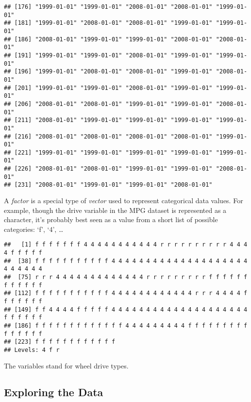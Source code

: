 \documentclass[
]{article}
\newenvironment{Shaded}{\begin{snugshade}}{\end{snugshade}}
\newcommand{\FunctionTok}[1]{\textcolor[rgb]{0.00,0.00,0.00}{#1}}
\newcommand{\NormalTok}[1]{#1}
\newcommand{\SpecialCharTok}[1]{\textcolor[rgb]{0.00,0.00,0.00}{#1}}
\begin{document}
\begin{verbatim}
## [176] "1999-01-01" "1999-01-01" "2008-01-01" "2008-01-01" "1999-01-01"
## [181] "1999-01-01" "2008-01-01" "2008-01-01" "1999-01-01" "1999-01-01"
## [186] "2008-01-01" "1999-01-01" "1999-01-01" "2008-01-01" "2008-01-01"
## [191] "1999-01-01" "1999-01-01" "2008-01-01" "1999-01-01" "1999-01-01"
## [196] "1999-01-01" "2008-01-01" "2008-01-01" "1999-01-01" "2008-01-01"
## [201] "1999-01-01" "1999-01-01" "2008-01-01" "1999-01-01" "1999-01-01"
## [206] "2008-01-01" "2008-01-01" "1999-01-01" "1999-01-01" "2008-01-01"
## [211] "2008-01-01" "1999-01-01" "1999-01-01" "1999-01-01" "1999-01-01"
## [216] "2008-01-01" "2008-01-01" "2008-01-01" "2008-01-01" "1999-01-01"
## [221] "1999-01-01" "1999-01-01" "1999-01-01" "1999-01-01" "1999-01-01"
## [226] "2008-01-01" "2008-01-01" "1999-01-01" "1999-01-01" "2008-01-01"
## [231] "2008-01-01" "1999-01-01" "1999-01-01" "2008-01-01"
\end{verbatim}

A \emph{factor} is a special type of \emph{vector} used to represent
categorical data values. For example, though the drive variable in the
MPG dataset is represented as a character, it's probably best seen as a
value from a short list of possible categories: `f', `4', \ldots{}

\begin{Shaded}
\end{Shaded}

\begin{verbatim}
##   [1] f f f f f f f 4 4 4 4 4 4 4 4 4 4 4 r r r r r r r r r r 4 4 4 4 f f f f f
##  [38] f f f f f f f f f f f 4 4 4 4 4 4 4 4 4 4 4 4 4 4 4 4 4 4 4 4 4 4 4 4 4 4
##  [75] r r r 4 4 4 4 4 4 4 4 4 4 4 4 4 r r r r r r r r r f f f f f f f f f f f f
## [112] f f f f f f f f f f f 4 4 4 4 4 4 4 4 4 4 4 4 r r r 4 4 4 4 f f f f f f f
## [149] f f 4 4 4 4 f f f f f 4 4 4 4 4 4 4 4 4 4 4 4 4 4 4 4 4 4 4 4 f f f f f f
## [186] f f f f f f f f f f f f f 4 4 4 4 4 4 4 4 4 f f f f f f f f f f f f f f f
## [223] f f f f f f f f f f f f
## Levels: 4 f r
\end{verbatim}

The variables stand for wheel drive types.

\hypertarget{exploring-the-data}{%
\subsection{Exploring the Data}\label{exploring-the-data}}
\end{document}

